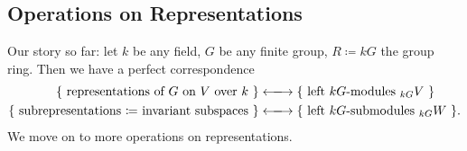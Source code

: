 \documentclass[12pt]{article}
\theoremstyle{definition}
\begin{document}
\subsection{Operations on Representations}
Our story so far: let $k$ be any field, $G$ be any finite group, $R\coloneqq kG$ the group ring. Then we have a perfect correspondence
\begin{equation}
    \begin{split}
        \{\text{ representations of $G$ on $V$ over $k$ }\}&\xlongleftrightarrow{}\{\text{ left $kG$-modules $_{kG}V$ }\}\\
        \{\text{ subrepresentations $\coloneqq$  invariant subspaces }\}&\xlongleftrightarrow{}\{\text{ left $kG$-submodules $_{kG}W$ }\}.
    \end{split}
\end{equation}
We move on to more operations on representations.
\end{document}
